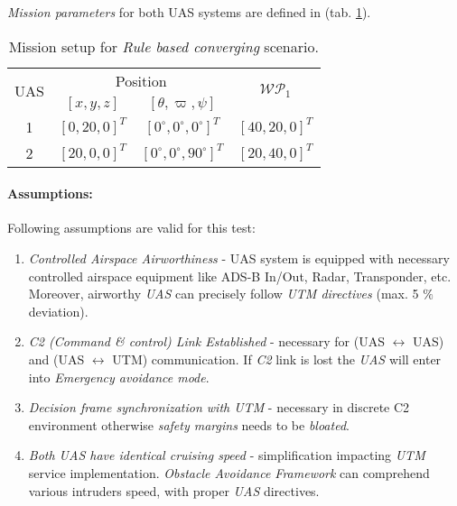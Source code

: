\noindent\emph{Mission parameters} for both UAS systems are defined in (tab. \ref{tab:missionSetupRuleBasedConvergingScenario}).

\begin{table}[H]
    \centering
    \begin{tabular}{c||c|c||c}
        \multirow{2}{*}{UAS} &\multicolumn{2}{c||}{Position} & \multirow{2}{*}{$\mathscr{WP}_1$} \\\cline{2-3}
          & $[x,y,z]$           & $[\theta,\varpi,\psi]$           & \\\hline\hline
        1 & $[0,20,0]^T $       & $[0^\circ,0^\circ,0^\circ]^T$    & $[40,20,0]^T$\\\hline 
        2 & $[20,0,0]^T $       & $[0^\circ,0^\circ,90^\circ]^T$    & $[20,40,0]^T$\\
    \end{tabular}
    \caption{Mission setup for \emph{Rule based converging} scenario.}
    \label{tab:missionSetupRuleBasedConvergingScenario}
\end{table}


\paragraph{Assumptions:} Following assumptions are valid for this test:

\begin{enumerate}
	\item \emph{Controlled Airspace Airworthiness} - UAS system is equipped with necessary controlled airspace equipment like ADS-B In/Out, Radar, Transponder, etc. Moreover, airworthy \emph{UAS} can precisely follow \emph{UTM directives} (max. 5 $\%$ deviation).
	
	\item \emph{C2 (Command \& control) Link Established} - necessary for (UAS $\leftrightarrow$ UAS) and (UAS $\leftrightarrow$ UTM) communication. If \emph{C2} link is lost the \emph{UAS} will enter into \emph{Emergency avoidance mode}.
	
	\item \emph{Decision frame synchronization with UTM} - necessary in discrete C2 environment otherwise \emph{safety margins} needs to be \emph{bloated}.
	
	\item \emph{Both UAS have identical cruising speed} - simplification impacting \emph{UTM} service implementation. \emph{Obstacle Avoidance Framework} can comprehend various intruders speed, with proper \emph{UAS} directives.
\end{enumerate}

